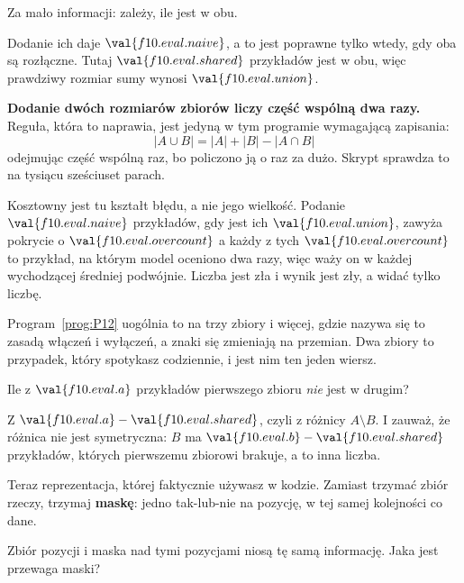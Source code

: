 \begin{fr}
\begin{ansblock}
Za mało informacji: zależy, ile jest w obu.
\end{ansblock}

Dodanie ich daje $\val{f10.eval.naive}$, a to jest poprawne tylko wtedy, gdy
oba są rozłączne. Tutaj $\val{f10.eval.shared}$ przykładów jest w obu, więc
prawdziwy rozmiar sumy wynosi $\val{f10.eval.union}$.

\begin{trapbox}
\textbf{Dodanie dwóch rozmiarów zbiorów liczy część wspólną dwa razy.} Reguła,
która to naprawia, jest jedyną w tym programie wymagającą zapisania:
\[ \lvert A \cup B \rvert = \lvert A \rvert + \lvert B \rvert
   - \lvert A \cap B \rvert \]
odejmując część wspólną raz, bo policzono ją o raz za dużo. Skrypt sprawdza to
na tysiącu sześciuset parach.

Kosztowny jest tu kształt błędu, a nie jego wielkość. Podanie
$\val{f10.eval.naive}$ przykładów, gdy jest ich $\val{f10.eval.union}$, zawyża
pokrycie o $\val{f10.eval.overcount}$ \dash{} a każdy z tych
$\val{f10.eval.overcount}$ to przykład, na którym model oceniono dwa razy, więc
waży on w każdej wychodzącej średniej podwójnie. Liczba jest zła i wynik jest
zły, a widać tylko liczbę.

Program~\ref{prog:P12} uogólnia to na trzy zbiory i więcej, gdzie nazywa się to
zasadą włączeń i wyłączeń, a znaki się zmieniają na przemian. Dwa zbiory to
przypadek, który spotykasz codziennie, i jest nim ten jeden wiersz.
\end{trapbox}

\end{fr}

\begin{fr}
Ile z $\val{f10.eval.a}$ przykładów pierwszego zbioru \emph{nie} jest w drugim?
\nextframe
\end{fr}

\begin{fr}
Z $\val{f10.eval.a} - \val{f10.eval.shared}$, czyli z różnicy $A \setminus B$.
I zauważ, że różnica nie jest symetryczna: $B$ ma
$\val{f10.eval.b} - \val{f10.eval.shared}$ przykładów, których pierwszemu
zbiorowi brakuje, a to inna liczba.

Teraz reprezentacja, której faktycznie używasz w kodzie. Zamiast trzymać zbiór
rzeczy, trzymaj \textbf{maskę}: jedno tak-lub-nie na pozycję, w tej samej
kolejności co dane.

Zbiór pozycji i maska nad tymi pozycjami niosą tę samą informację. Jaka jest
przewaga maski?
\nextframe
\end{fr}

